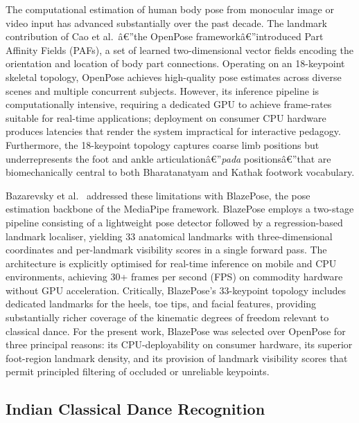 \documentclass[journal]{IEEEtran}
\begin{document}
The computational estimation of human body pose from monocular image or
video input has advanced substantially over the past decade. The
landmark contribution of Cao et al.~\cite{openpose2017}â€”the OpenPose
frameworkâ€”introduced Part Affinity Fields (PAFs), a set of learned
two-dimensional vector fields encoding the orientation and location of
body part connections. Operating on an 18-keypoint skeletal topology,
OpenPose achieves high-quality pose estimates across diverse scenes and
multiple concurrent subjects. However, its inference pipeline is
computationally intensive, requiring a dedicated GPU to achieve
frame-rates suitable for real-time applications; deployment on
consumer CPU hardware produces latencies that render the system
impractical for interactive pedagogy. Furthermore, the 18-keypoint
topology captures coarse limb positions but underrepresents the foot
and ankle articulationâ€”\textit{pada} positionsâ€”that are biomechanically
central to both Bharatanatyam and Kathak footwork vocabulary.

Bazarevsky et al.~\cite{blazepose2020} addressed these limitations
with BlazePose, the pose estimation backbone of the MediaPipe
framework. BlazePose employs a two-stage pipeline consisting of a
lightweight pose detector followed by a regression-based landmark
localiser, yielding 33 anatomical landmarks with three-dimensional
coordinates and per-landmark visibility scores in a single
forward pass. The architecture is explicitly optimised for real-time
inference on mobile and CPU environments, achieving 30+ frames per
second (FPS) on commodity hardware without GPU acceleration.
Critically, BlazePose's 33-keypoint topology includes dedicated
landmarks for the heels, toe tips, and facial features, providing
substantially richer coverage of the kinematic degrees of freedom
relevant to classical dance. For the present work, BlazePose was
selected over OpenPose for three principal reasons: its
CPU-deployability on consumer hardware, its superior foot-region
landmark density, and its provision of landmark visibility scores
that permit principled filtering of occluded or unreliable keypoints.

\subsection{Indian Classical Dance Recognition}
\end{document}
